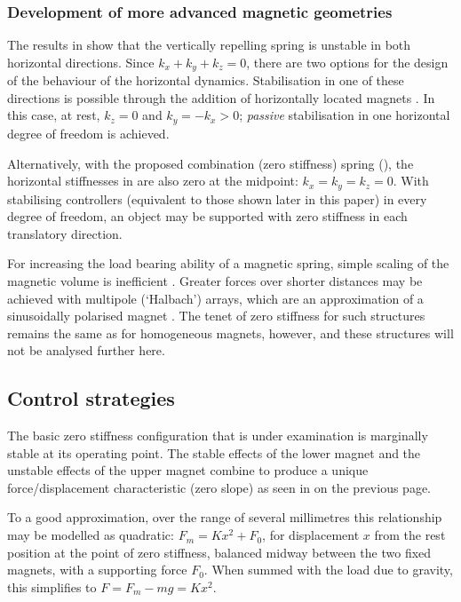 \subsubsection{Development of more advanced magnetic geometries}


The results in  show that the vertically repelling
spring is unstable in both horizontal directions. Since
$k_x+k_y+k_z=0$, there are two options for the design of the
behaviour of the horizontal dynamics. Stabilisation in one of these
directions is possible through the addition of horizontally located
magnets \cite{robertson2005}. In this case, at rest, $k_z=0$ and
$k_y=-k_x>0$; \emph{passive} stabilisation in one horizontal degree
of freedom is achieved.

Alternatively, with the proposed combination (zero stiffness) spring
(), the horizontal stiffnesses in
 are also zero at the midpoint: $k_x=k_y=k_z=0$.
With stabilising controllers (equivalent to those shown later in
this paper) in every degree of freedom, an object may be supported
with zero stiffness in each translatory direction.

For increasing the load bearing ability of a magnetic spring, simple
scaling of the magnetic volume is inefficient \cite{yonnet1991}.
Greater forces over shorter distances may be achieved with multipole
(`Halbach') arrays, which are an approximation of a sinusoidally
polarised magnet \cite{robertson2005}. The tenet of zero stiffness
for such structures remains the same as for homogeneous magnets,
however, and these structures will not be analysed further here.

\subsection{Control strategies}

The basic zero stiffness configuration that is under examination is
marginally stable at its operating point. The stable effects of the
lower magnet and the unstable effects of the upper magnet combine to
produce a unique force/displacement characteristic (zero slope) as
seen in  on the previous page.

To a good approximation, over the range of several millimetres this
relationship may be modelled as quadratic: $F_m = K x^2 + F_0$, for
displacement $x$ from the rest position at the point of zero
stiffness, balanced midway between the two fixed magnets, with a
supporting force $F_0$. When summed with the load due to gravity,
this simplifies to $F = F_m - mg = K x^2$.

